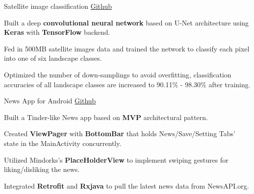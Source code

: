 \begin{cvprojects}
    \cvproject
    {Satellite image classification}
    {\href{https://github.com/wuhxxx/satellite-image-unet}{Github}}
    {}
    {
      \begin{cvitems}
        \item {Built a deep \textbf{convolutional neural network} based on U-Net architecture using \textbf{Keras} with \textbf{TensorFlow} backend.}
        \item {Fed in 500MB satellite images data and trained the network to classify each pixel into one of six landscape classes.}
        \item {Optimized the number of down-samplings to avoid overfitting, classification accuracies of all landscape classes are increased to 90.11\% - 98.30\% after training. }
      \end{cvitems}
    }
    
    
    
    \cvproject
    {News App for Android}
    {\href{https://github.com/wuhxxx/news-app}{Github}}
    {}
    {
      \begin{cvitems}
        \item {Built a Tinder-like News app based on \textbf{MVP} architectural pattern.}
        \item {Created \textbf{ViewPager} with \textbf{BottomBar} that holds News/Save/Setting Tabs’ state in the MainActivity concurrently.}
        \item {Utilized Mindorks’s \textbf{PlaceHolderView} to implement swiping gestures for liking/disliking the news.}
        \item{Integrated \textbf{Retrofit} and \textbf{Rxjava} to pull the latest news data from NewsAPI.org.}
      \end{cvitems}
    }
    

    
    

\end{cvprojects}
